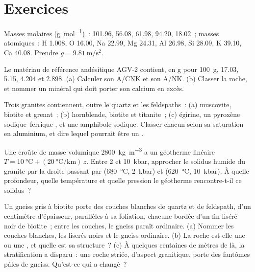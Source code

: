 \section{Exercices}\label{sec:b2:crustal-melting:exercises}

Masses molaires (\unit{\gram\per\mole})~:  101.96,  56.08,  61.98,
 94.20,  18.02~; masses atomiques~: H 1.008, O 16.00, Na 22.99, Mg 24.31,
Al 26.98, Si 28.09, K 39.10, Ca 40.08. Prendre $g = \qty{9.81}{\metre\per\second\squared}$.

\begin{exercise}[$\star$]\label{exo:b2:crustal-melting:1}
Le matériau de référence andésitique AGV-2 contient, en \unit{\gram} pour \qty{100}{\gram},
 17.03,  5.15,  4.204 et  2.898.
(a) Calculer son A/CNK et son A/NK. (b) Classer la roche, et nommer un minéral qui doit porter son
calcium en excès.
\end{exercise}

\begin{exercise}[$\star$]\label{exo:b2:crustal-melting:2}
Trois granites contiennent, outre le quartz et les feldspaths~: (a) muscovite, biotite et grenat~;
(b) hornblende, biotite et titanite~; (c) égirine, un pyroxène sodique--ferrique
, et une amphibole sodique. Classer chacun selon sa saturation en aluminium, et dire
lequel pourrait être un .
\end{exercise}

\begin{exercise}[$\star$]\label{exo:b2:crustal-melting:3}
Une croûte de masse volumique \qty{2800}{\kilogram\per\cubic\metre} a un géotherme linéaire
$T = \qty{10}{\celsius} + (\qty{20}{\celsius\per\kilo\metre})\,z$. Entre 2 et
\qty{10}{kbar}, approcher le solidus humide du granite par la droite passant par
(\qty{680}{\celsius}, \qty{2}{kbar}) et (\qty{620}{\celsius}, \qty{10}{kbar}). À quelle
profondeur, quelle température et quelle pression le géotherme rencontre-t-il ce solidus~?
\end{exercise}

\begin{exercise}[$\star$]\label{exo:b2:crustal-melting:4}
Un gneiss gris à biotite porte des couches blanches de quartz et de feldspath, d'un centimètre d'épaisseur,
parallèles à sa foliation, chacune bordée d'un fin liséré noir de biotite~; entre les couches, le gneiss
paraît ordinaire. (a) Nommer les couches blanches, les liserés noirs et le gneiss ordinaire. (b) La roche
est-elle une  ou une , et quelle est sa structure~? (c) À quelques centaines de
mètres de là, la stratification a disparu~: une roche striée, d'aspect granitique, porte des fantômes
pâles de gneiss. Qu'est-ce qui a changé~?
\end{exercise}

